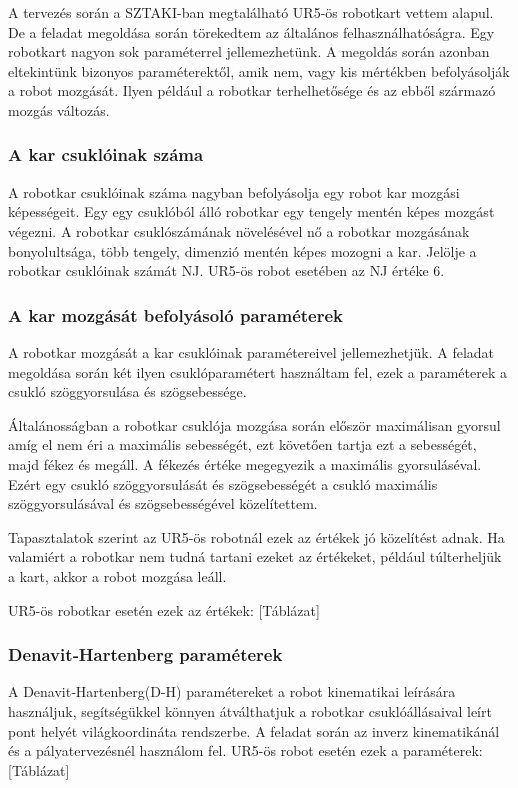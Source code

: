 A tervezés során a SZTAKI-ban megtalálható UR5-ös robotkart vettem alapul. De a feladat megoldása során törekedtem az általános felhasználhatóságra. Egy robotkart nagyon sok paraméterrel jellemezhetünk. A megoldás során azonban eltekintünk bizonyos paraméterektől, amik nem, vagy kis mértékben befolyásolják a robot mozgását. Ilyen például a robotkar terhelhetősége és az ebből származó mozgás változás.
\subsubsection{A kar csuklóinak száma}

A robotkar csuklóinak száma nagyban befolyásolja egy robot kar mozgási képességeit. Egy egy csuklóból álló robotkar egy tengely mentén képes mozgást végezni. A robotkar csuklószámának növelésével nő a robotkar mozgásának bonyolultsága, több tengely, dimenzió mentén képes mozogni a kar. Jelölje a robotkar csuklóinak számát NJ. UR5-ös robot esetében az NJ értéke 6.

\subsubsection{A kar mozgását befolyásoló paraméterek}

A robotkar mozgását a kar csuklóinak paramétereivel jellemezhetjük. A feladat megoldása során két ilyen csuklóparamétert használtam fel, ezek a paraméterek a csukló szöggyorsulása és szögsebessége.

Általánosságban a robotkar csuklója mozgása során először maximálisan gyorsul amíg el nem éri a maximális sebességét, ezt követően tartja ezt a sebességét, majd fékez és megáll. A fékezés értéke megegyezik a maximális gyorsuláséval.
Ezért egy csukló szöggyorsulását és szögsebességét a csukló maximális szöggyorsulásával és szögsebességével közelítettem.

Tapasztalatok szerint az  UR5-ös robotnál ezek az értékek jó közelítést adnak. Ha valamiért a robotkar nem tudná tartani ezeket az értékeket, például túlterheljük a kart, akkor a robot mozgása leáll. 

UR5-ös robotkar esetén ezek az értékek:
[Táblázat]

\subsubsection{Denavit‑Hartenberg paraméterek}

A Denavit‑Hartenberg(D-H) paramétereket a robot kinematikai leírására használjuk, segítségükkel könnyen átválthatjuk a robotkar csuklóállásaival leírt pont helyét világkoordináta rendszerbe. A feladat során az inverz kinematikánál és a pályatervezésnél használom fel.
UR5-ös robot esetén ezek a paraméterek:
[Táblázat]

